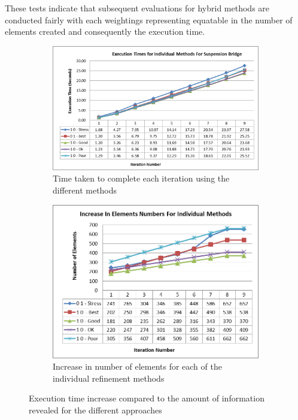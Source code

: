 \noindent
These tests indicate that subsequent evaluations for hybrid methods are conducted fairly with each weightings representing equatable in  the number of elements created and consequently the execution time. \\


\begin{figure}[H]
\centering
\begin{subfigure}{.5\textwidth}
  \centering
  \includegraphics[width=0.9\linewidth]{../Graphics/Graphs/SingleMethods/ExecutionTimes.png}
  \caption{Time taken to complete each iteration using the different methods}
  \label{fig:sub1}
\end{subfigure}%
\begin{subfigure}{.5\textwidth}
  \centering
  \includegraphics[width=0.75\linewidth]{../Graphics/Graphs/SingleMethods/NumberOfElements.png}
  \caption{Increase in number of elements for each of the individual refinement methods}
  \label{fig:sub2}
\end{subfigure}
\label{fig:test}
  \caption{Execution time increase compared to the amount of information revealed for the different approaches}
 \end{figure}
 
